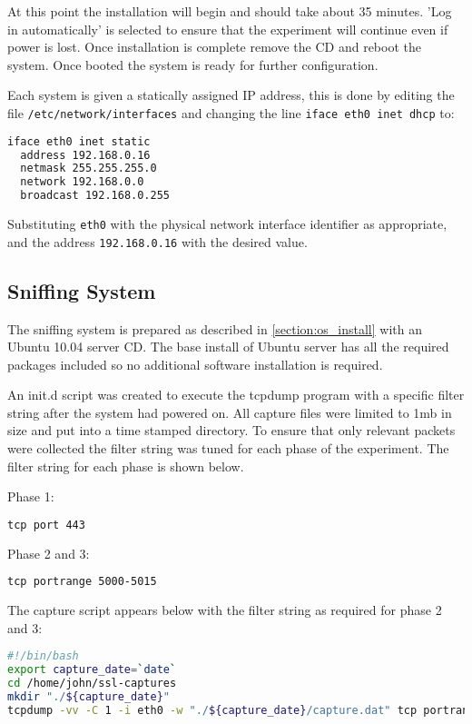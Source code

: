 At this point the installation will begin and should take about 35 minutes.
'Log in automatically' is selected to ensure that the experiment will continue
even if power is lost. Once installation is complete remove the CD and reboot
the system. Once booted the system is ready for further configuration.

Each system is given a statically assigned IP address, this is done by editing
the file \verb+/etc/network/interfaces+ and changing the line \verb+iface eth0 inet dhcp+
to:

\begin{lstlisting}[language=sh]
iface eth0 inet static
  address 192.168.0.16
  netmask 255.255.255.0
  network 192.168.0.0
  broadcast 192.168.0.255
\end{lstlisting}

Substituting \verb+eth0+ with the physical network interface identifier as
appropriate, and the address \verb+192.168.0.16+ with the desired value.

\subsection{Sniffing System}

The sniffing system is prepared as described in \ref{section:os_install} with an
Ubuntu 10.04 server CD. The base install of Ubuntu server has all the required
packages included so no additional software installation is required.

An init.d script was created to execute the tcpdump program with a specific
filter string after the system had powered on. All capture files were limited to
1mb in size and put into a time stamped directory. To ensure that only relevant
packets were collected the filter string was tuned for each phase of the
experiment. The filter string for each phase is shown below.

Phase 1:
\begin{lstlisting}[language=sh]
tcp port 443
\end{lstlisting}

Phase 2 and 3:
\begin{lstlisting}[language=sh]
tcp portrange 5000-5015
\end{lstlisting}

The capture script appears below with the filter string as required for phase 2
and 3:

\begin{lstlisting}[language=sh]
#!/bin/bash
export capture_date=`date`
cd /home/john/ssl-captures
mkdir "./${capture_date}"
tcpdump -vv -C 1 -i eth0 -w "./${capture_date}/capture.dat" tcp portrange 5001-5015
\end{lstlisting}

